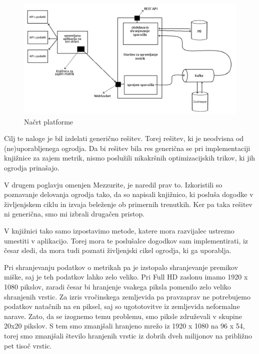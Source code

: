 \documentclass[a4paper, 12pt]{book}
\begin{document}
\begin{figure}[h]
	\begin{center}
		\includegraphics[width=1\textwidth]{design.png}
	\end{center}
	\caption{Načrt platforme}
	\label{img:design}
\end{figure}

Cilj te naloge je bil izdelati generično rešitev. Torej rešitev, ki je neodvisna od (ne)uporabljenega ogrodja. Da bi rešitev bila res generična se pri implementaciji knjižnice za zajem metrik, nismo poslužili nikakršnih optimizacijskih trikov, ki jih ogrodja prinašajo.

V drugem poglavju omenjen Mezzurite, je naredil prav to. Izkoristili so poznavanje delovanja ogrodja tako, da so napisali knjižnico, ki posluša dogodke v življenjskem ciklu in izvaja beleženje ob primernih trenutkih. Ker pa taka rešitev ni generična, smo mi izbrali drugačen pristop.

V knjižnici tako samo izpostavimo metode, katere mora razvijalec ustrezno umestiti v aplikacijo. Torej mora te poslušalce dogodkov sam implementirati, iz česar sledi, da mora tudi poznati življenjski cikel ogrodja, ki ga uporablja.

Pri shranjevanju podatkov o metrikah pa je izstopalo shranjevanje premikov miške, saj je teh podatkov lahko zelo veliko. Pri Full HD zaslonu imamo 1920 x 1080 pikslov, zaradi česar bi hranjenje vsakega piksla pomenilo zelo veliko shranjenih vrstic. Za izris vročinskega zemljevida pa pravzaprav ne potrebujemo podatkov natačnih na en piksel, saj so ugototovitve iz zemljevida neformalne narave. Zato, da se izognemo temu problemu, smo piksle združevali v skupine 20x20 pikslov. S tem smo zmanjšali hranjeno mrežo iz 1920 x 1080 na 96 x 54, torej smo zmanjšali število hranjenih vrstic iz dobrih dveh milijonov na približno pet tisoč vrstic.
\end{document}
